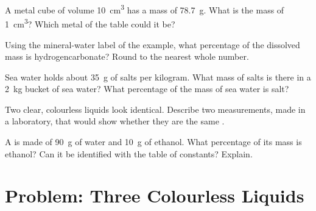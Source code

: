 \begin{exercise}[$\star\star$]\label{exo:g6:pure-substances-and-mixtures:8}
A metal cube of volume \qty{10}{cm^3} has a mass of \qty{78.7}{g}. What
is the mass of \qty{1}{cm^3}? Which metal of the table could it be?
\end{exercise}

\begin{exercise}[$\star\star$]\label{exo:g6:pure-substances-and-mixtures:9}
Using the mineral-water label of the example, what percentage of the
dissolved mass is hydrogencarbonate? Round to the nearest whole number.
\end{exercise}

\begin{exercise}[$\star\star$]\label{exo:g6:pure-substances-and-mixtures:10}
Sea water holds about \qty{35}{g} of salts per kilogram. What mass of
salts is there in a \qty{2}{kg} bucket of sea water? What percentage of
the mass of sea water is salt?
\end{exercise}

\begin{exercise}[$\star\star\star$]\label{exo:g6:pure-substances-and-mixtures:11}
Two clear, colourless liquids look identical. Describe two measurements,
made in a laboratory, that would show whether they are the same .
\end{exercise}

\begin{exercise}[$\star\star\star$]\label{exo:g6:pure-substances-and-mixtures:12}
A  is made of \qty{90}{g} of water and \qty{10}{g} of ethanol.
What percentage of its mass is ethanol? Can it be identified with the
table of constants? Explain.
\end{exercise}

\section{Problem: Three Colourless Liquids}

